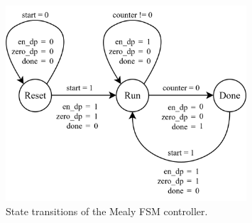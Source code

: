 \documentclass[../main.tex]{subfiles}
\begin{document}
\begin{figure}[H]
    \centering
    \includegraphics[width=0.8\textwidth]{assets/q4_controller.png}
    \caption{State transitions of the Mealy FSM controller.}
    \label{fig:q4_controller}
\end{figure}

\newpage
\end{document}
